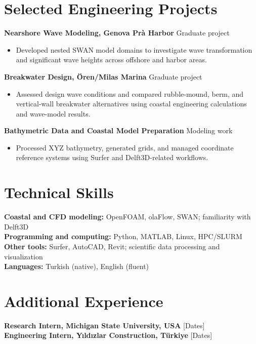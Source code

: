 \documentclass[10pt,a4paper]{article}
\begin{document}
\section*{Selected Engineering Projects}
\textbf{Nearshore Wave Modeling, Genova Pr\`a Harbor} \hfill \textcolor{muted}{Graduate project}
\begin{itemize}
  \item Developed nested SWAN model domains to investigate wave transformation and significant wave heights across offshore and harbor areas.
\end{itemize}
\vspace{2pt}
\textbf{Breakwater Design, \"Oren/Milas Marina} \hfill \textcolor{muted}{Graduate project}
\begin{itemize}
  \item Assessed design wave conditions and compared rubble-mound, berm, and vertical-wall breakwater alternatives using coastal engineering calculations and wave-model results.
\end{itemize}
\vspace{2pt}
\textbf{Bathymetric Data and Coastal Model Preparation} \hfill \textcolor{muted}{Modeling work}
\begin{itemize}
  \item Processed XYZ bathymetry, generated grids, and managed coordinate reference systems using Surfer and Delft3D-related workflows.
\end{itemize}

\section*{Technical Skills}
\textbf{Coastal and CFD modeling:} OpenFOAM, olaFlow, SWAN; familiarity with Delft3D\\[3pt]
\textbf{Programming and computing:} Python, MATLAB, Linux, HPC/SLURM\\[3pt]
\textbf{Other tools:} Surfer, AutoCAD, Revit; scientific data processing and visualization\\[3pt]
\textbf{Languages:} Turkish (native), English (fluent)

\section*{Additional Experience}
\textbf{Research Intern, Michigan State University, USA} \hfill \textcolor{muted}{[Dates]}\\[3pt]
\textbf{Engineering Intern, Y\i ld\i zlar Construction, T\"urkiye} \hfill \textcolor{muted}{[Dates]}
\end{document}
